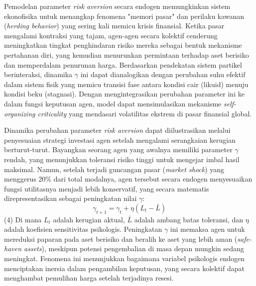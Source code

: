 Pemodelan parameter \textit{risk aversion} secara endogen memungkinkan sistem ekonofisika untuk menangkap fenomena "memori pasar" dan perilaku kawanan (\textit{herding behavior}) yang sering kali memicu krisis finansial. Ketika pasar mengalami kontraksi yang tajam, agen-agen secara kolektif cenderung meningkatkan tingkat penghindaran risiko mereka sebagai bentuk mekanisme pertahanan diri, yang kemudian menurunkan permintaan terhadap aset berisiko dan memperdalam penurunan harga. Berdasarkan pendekatan sistem partikel berinteraksi, dinamika $\gamma$ ini dapat dianalogikan dengan perubahan suhu efektif dalam sistem fisik yang memicu transisi fase antara kondisi cair (likuid) menuju kondisi beku (stagnasi). Dengan mengintegrasikan perubahan parameter ini ke dalam fungsi keputusan agen, model dapat mensimulasikan mekanisme \textit{self-organizing criticality} yang mendasari volatilitas ekstrem di pasar finansial global.

\begin{example}
    Dinamika perubahan parameter \textit{risk aversion} dapat diilustrasikan melalui penyesuaian strategi investasi agen setelah mengalami serangkaian kerugian berturut-turut. Bayangkan seorang agen yang awalnya memiliki parameter $\gamma$ rendah, yang menunjukkan toleransi risiko tinggi untuk mengejar imbal hasil maksimal. Namun, setelah terjadi guncangan pasar (\textit{market shock}) yang menggerus 20\% dari total modalnya, agen tersebut secara endogen menyesuaikan fungsi utilitasnya menjadi lebih konservatif, yang secara matematis direpresentasikan sebagai peningkatan nilai $\gamma$:
    $$ \gamma_{t+1} = \gamma_t + \eta (L_t - \bar{L}) $$ (4)
    Di mana $L_t$ adalah kerugian aktual, $\bar{L}$ adalah ambang batas toleransi, dan $\eta$ adalah koefisien sensitivitas psikologis. Peningkatan $\gamma$ ini memaksa agen untuk mereduksi paparan pada aset berisiko dan beralih ke aset yang lebih aman (\textit{safe-haven assets}), meskipun potensi pengembalian di masa depan mungkin sedang meningkat. Fenomena ini menunjukkan bagaimana variabel psikologis endogen menciptakan inersia dalam pengambilan keputusan, yang secara kolektif dapat menghambat pemulihan harga setelah terjadinya resesi.
\end{example}